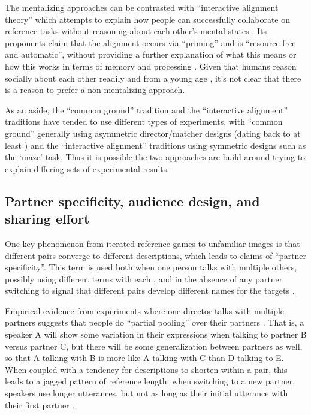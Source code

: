 \documentclass[]{article}
\begin{document}
The mentalizing approaches can be contrasted with ``interactive alignment theory'' which attempts to explain how people can successfully collaborate on reference tasks without reasoning about each other's mental states \citep{pickering2004, gandolfi2022}. Its proponents claim that the alignment occurs via ``priming'' and is ``resource-free and automatic'', without providing a further explanation of what this means or how this works in terms of memory and processing \citep{pickering2004}.  Given that humans reason socially about each other readily and from a young age \citep{TODO}, it's not clear that there is a reason to prefer a non-mentalizing approach. 

As an aside, the ``common ground'' tradition and the ``interactive alignment'' traditions have tended to use different types of experiments, with ``common ground'' generally using asymmetric director/matcher designs (dating back to at least \citet{krauss1966}) and the ``interactive alignment'' traditions using symmetric designs such as the `maze' task. Thus it is possible the two approaches are build around trying to explain differing sets of experimental results. 

\subsection{Partner specificity, audience design, and sharing effort}

One key phenomenon from iterated reference games to unfamiliar images is that different pairs converge to different descriptions, which leads to claims of ``partner specificity''. This term is used both when one person talks with multiple others, possibly using different terms with each \citep{TODO}, and in the absence of any partner switching to signal that different pairs develop different names for the targets \citep{TODO}. 

Empirical evidence from experiments where one director talks with multiple partners suggests that people do ``partial pooling'' over their partners \citep{hawkins2021, yoon2014}. That is, a speaker A will show some variation in their expressions when talking to partner B versus partner C, but there will be some generalization between partners as well, so that A talking with B is more like A talking with C than D talking to E. When coupled with a tendency for descriptions to shorten within a pair, this leads to a jagged pattern of reference length: when switching to a new partner, speakers use longer utterances, but not as long as their initial utterance with their first partner \citep{yoon2019a}.  
\end{document}
